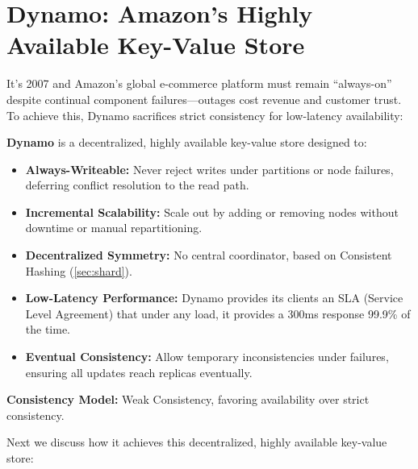\newpage

\section{Dynamo: Amazon's Highly Available Key-Value Store}

It's 2007 and Amazon's global e-commerce platform must remain ``always-on'' despite continual component failures—outages cost revenue and customer trust. To achieve this, Dynamo sacrifices strict consistency for low-latency availability:

\begin{Def}
    \textbf{Dynamo} is a decentralized, highly available key-value store designed to:
    \begin{itemize}
      \item \textbf{Always-Writeable:} Never reject writes under partitions or node failures, deferring conflict resolution to the read path.
      \item \textbf{Incremental Scalability:} Scale out by adding or removing nodes without downtime or manual repartitioning.
      \item \textbf{Decentralized Symmetry:} No central coordinator, based on Consistent Hashing (\ref{sec:shard}).
      \item \textbf{Low-Latency Performance:} Dynamo provides its clients an SLA (Service Level Agreement) that under any load, it provides 
      a 300ms response 99.9\% of the time.
      \item \textbf{Eventual Consistency:} Allow temporary inconsistencies under failures, ensuring all updates reach replicas eventually.
    \end{itemize}
    \noindent
    \textbf{Consistency Model:} Weak Consistency, favoring availability over strict consistency.
  \end{Def}
  

  \noindent
  Next we discuss how it achieves this decentralized, highly available key-value store:

